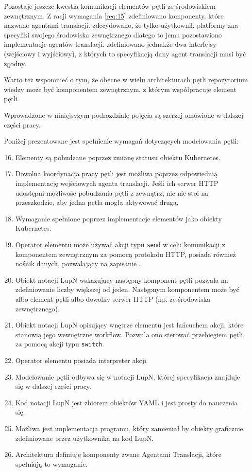 Pozostaje jeszcze kwestia komunikacji elementów pętli ze środowiskiem zewnętrznym. Z racji wymagania \ref{req:15} zdefiniowano komponenty, które nazwano agentami translacji. zdecydowano, że tylko użytkownik platformy zna specyfiki swojego środowiska zewnętrznego dlatego to jemu pozostawiono implementacje agentów translacji. zdefiniowano jednakże dwa interfejsy (wejściowy i wyjściowy), z których to specyfikacją dany agent translacji musi być zgodny. 

Warto też wspomnieć o tym, że obecne w wielu architekturach pętli repozytorium wiedzy może być komponentem zewnętrznym, z którym współpracuje element pętli.

Wprowadzone w niniejsyzym podrozdziale pojęcia są szerzej omówione w dalszej części pracy. 

Poniżej prezentowane jest spełnienie wymagań dotyczących modelowania pętli:
\begin{enumerate}
    \setcounter{enumi}{15}
    \item Elementy są pobudzane poprzez zmianę statusu obiektu Kubernetes.
    \item Dowolna koordynacja pracy pętli jest możliwa poprzez odpowiednią implementację wejściowych agenta translacji. Jeśli ich serwer HTTP udostępni możliwość pobudzania pętli z zewnątrz, nic nie stoi na przeszkodzie, aby jedna pętla mogła aktywować drugą.
    \item Wymaganie spełnione poprzez implementacje elementów jako obiekty Kubernetes.
    \item Operator elementu może używać akcji typu \texttt{send} w celu komunikacji z komponentem zewnętrznym za pomocą protokołu HTTP, posiada również nośnik danych, pozwalający na zapisanie .
    \item Obiekt notacji LupN wskazujący następny komponent pętli pozwala na zdefiniowanie liczby większej od jeden. Następnym komponentem może być albo element pętli albo dowolny serwer HTTP (np. ze środowiska zewnętrznego).
    \item Obiekt notacji LupN opisujący wnętrze elementu jest łańcuchem akcji, które stanowią jego wewnętrzne workflow. Pozwala ono sterować przebiegiem pętli za pomocą akcji typu \texttt{switch}. 
    \item Operator elementu posiada interpreter akcji.
    \item Modelowanie pętli odbywa się w notacji LupN, której specyfikacja znajduje się w dalszej części pracy.
    \item Kod notacji LupN jest zbiorem obiektów YAML i jest prosty do nauczenia się.
    \item Możliwa jest implementacja programu, który zamieniał by obiekty graficznie zdefiniowane przez użytkownika na kod LupN.
    \item Architektura definiuje komponenty zwane Agentami Translacji, które spełniają to wymaganie.
\end{enumerate}
